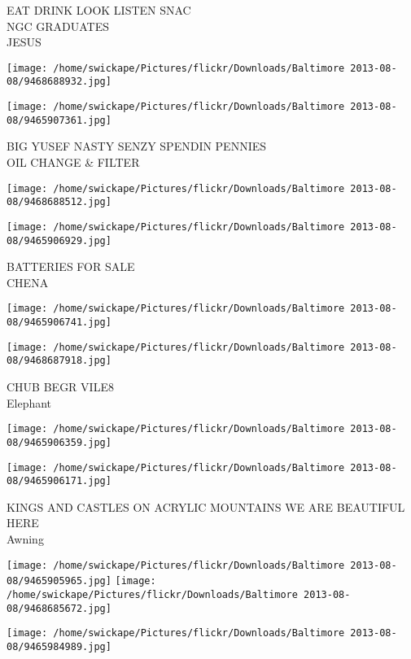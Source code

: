\documentclass[10pt,letterpaper]{article}
\begin{document}
EAT DRINK LOOK LISTEN SNAC\\
NGC GRADUATES\\
JESUS
\pagebreak

\texttt{[image: /home/swickape/Pictures/flickr/Downloads/Baltimore 2013-08-08/9468688932.jpg]}

\vspace{0.25in}
\texttt{[image: /home/swickape/Pictures/flickr/Downloads/Baltimore 2013-08-08/9465907361.jpg]}

BIG YUSEF NASTY SENZY SPENDIN PENNIES\\
OIL CHANGE \& FILTER
\pagebreak

\texttt{[image: /home/swickape/Pictures/flickr/Downloads/Baltimore 2013-08-08/9468688512.jpg]}

\vspace{0.25in}
\texttt{[image: /home/swickape/Pictures/flickr/Downloads/Baltimore 2013-08-08/9465906929.jpg]}

BATTERIES FOR SALE\\
CHENA
\pagebreak

\texttt{[image: /home/swickape/Pictures/flickr/Downloads/Baltimore 2013-08-08/9465906741.jpg]}

\vspace{0.25in}
\texttt{[image: /home/swickape/Pictures/flickr/Downloads/Baltimore 2013-08-08/9468687918.jpg]}

CHUB BEGR VILE8\\
Elephant
\pagebreak

\texttt{[image: /home/swickape/Pictures/flickr/Downloads/Baltimore 2013-08-08/9465906359.jpg]}

\vspace{0.25in}
\texttt{[image: /home/swickape/Pictures/flickr/Downloads/Baltimore 2013-08-08/9465906171.jpg]}

KINGS AND CASTLES ON ACRYLIC MOUNTAINS WE ARE BEAUTIFUL HERE\\
Awning
\pagebreak

\texttt{[image: /home/swickape/Pictures/flickr/Downloads/Baltimore 2013-08-08/9465905965.jpg]}
\texttt{[image: /home/swickape/Pictures/flickr/Downloads/Baltimore 2013-08-08/9468685672.jpg]}

\vspace{0.25in}
\texttt{[image: /home/swickape/Pictures/flickr/Downloads/Baltimore 2013-08-08/9465984989.jpg]}
\end{document}
